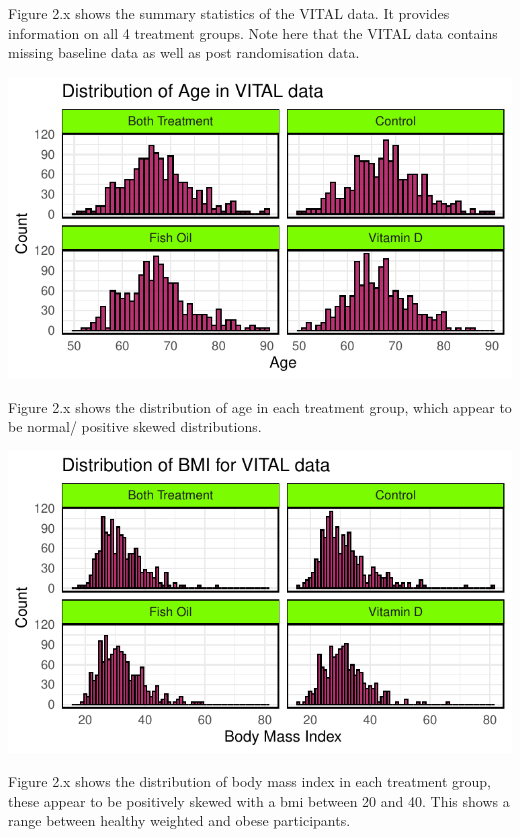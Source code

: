 \documentclass{article}
\begin{document}
Figure 2.x shows the summary statistics of the VITAL data. It provides
information on all 4 treatment groups. Note here that the VITAL data
contains missing baseline data as well as post randomisation data.

\begin{center}\includegraphics{Final_Report_files/figure-latex/unnamed-chunk-14-1} \end{center}

Figure 2.x shows the distribution of age in each treatment group, which
appear to be normal/ positive skewed distributions.

\begin{center}\includegraphics{Final_Report_files/figure-latex/unnamed-chunk-15-1} \end{center}

Figure 2.x shows the distribution of body mass index in each treatment
group, these appear to be positively skewed with a bmi between 20 and
40. This shows a range between healthy weighted and obese participants.
\end{document}
